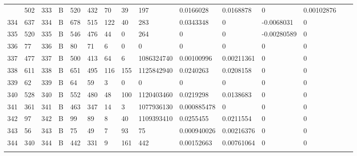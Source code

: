 \begin{longtable}{lllllllllllllll}
\begin{comment}
	333 & 502               & 333 & B   & 520               & 432               & 70                & 39   & 197        & 0.0166028      & 0.0168878      & 0             & 0.00102876   \\
	334 & 637               & 334 & B   & 678               & 515               & 122               & 40   & 283        & 0.0343348      & 0              & -0.0068031    & 0            \\
	335 & 520               & 335 & B   & 546               & 476               & 44                & 0    & 264        & 0              & 0              & -0.00280589   & 0            \\
	336 & 77                & 336 & B   & 80                & 71                & 6                 & 0    & 0          & 0              & 0              & 0             & 0            \\
	337 & 477               & 337 & B   & 500               & 413               & 64                & 6    & 1086324740 & 0.00100996     & 0.00211361     & 0             & 0            \\
	338 & 611               & 338 & B   & 651               & 495               & 116               & 155  & 1125842940 & 0.0240263      & 0.0208158      & 0             & 0            \\
	339 & 62                & 339 & B   & 64                & 59                & 3                 & 0    & 0          & 0              & 0              & 0             & 0            \\
	340 & 528               & 340 & B   & 552               & 480               & 48                & 100  & 1120403460 & 0.0219298      & 0.0138683      & 0             & 0            \\
	341 & 361               & 341 & B   & 463               & 347               & 14                & 3    & 1077936130 & 0.000885478    & 0              & 0             & 0            \\
	342 & 97                & 342 & B   & 99                & 89                & 8                 & 40   & 1109393410 & 0.0255455      & 0.0211554      & 0             & 0            \\
	343 & 56                & 343 & B   & 75                & 49                & 7                 & 93   & 75         & 0.000940026    & 0.00216376     & 0             & 0            \\
	344 & 340               & 344 & B   & 442               & 331               & 9                 & 161  & 442        & 0.00152663     & 0.00761064     & 0             & 0            \\

\end{comment}
\end{longtable}
